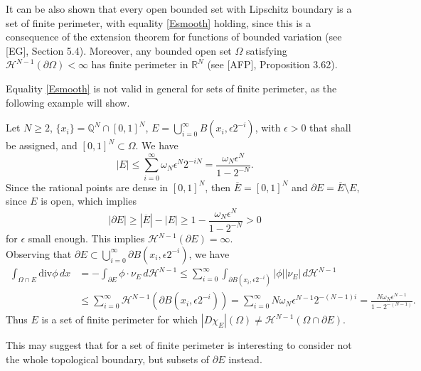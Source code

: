 \begin{remark} \label{finpersetexample} It can be also shown that every open bounded set with Lipschitz boundary is a set of finite perimeter, with equality \eqref{Esmooth} holding, since this is a consequence of the extension theorem for functions of bounded variation (see [EG], Section 5.4). Moreover, any bounded open set $\Omega$ satisfying $\mathcal{H}^{N - 1}(\partial \Omega) < \infty$ has finite perimeter in $\mathbb{R}^{N}$ (see [AFP], Proposition 3.62).
\end{remark}

Equality \eqref{Esmooth} is not valid in general for sets of finite perimeter, as the following example will show. 

\begin{example} Let $N \ge 2$, $\{ x_{i} \} = \mathbb{Q}^{N} \cap [0, 1]^{N}$, $E = \bigcup_{i = 0}^{\infty} B(x_{i}, \epsilon 2^{-i})$, with $\epsilon > 0$ that shall be assigned, and $[0, 1]^{N} \subset \Omega$. We have
\[ |E| \le \sum_{i = 0}^{\infty} \omega_{N} \epsilon^{N} 2^{-i N} = \frac{\omega_{N} \epsilon^{N}}{1 - 2^{- N}}. \]
Since the rational points are dense in $[0, 1]^{N}$, then $\overline{E} = [0, 1]^{N}$ and $\partial E = \overline{E} \setminus E$, since $E$ is open, which implies
\[ |\partial E| \ge |\overline{E}| - |E| \ge 1 - \frac{\omega_{N} \epsilon^{N}}{1 - 2^{- N}} > 0 \]
for $\epsilon$ small enough. This implies $\mathcal{H}^{N - 1}(\partial E) = \infty$. 
\\
Observing that $\partial E \subset \bigcup_{i = 0}^{\infty} \partial B(x_{i}, \epsilon 2^{- i})$, we have
\begin{align*} \int_{\Omega \cap E} \mathrm{div} \phi \, dx &  = - \int_{\partial E} \phi \cdot \nu_{E} \, d\mathcal{H}^{N - 1} \le \sum_{i = 0}^{\infty} \int_{\partial B(x_{i}, \epsilon 2^{- i})} |\phi| |\nu_{E}| \, d\mathcal{H}^{N - 1} \\
& \le  \sum_{i = 0}^{\infty} \mathcal{H}^{N - 1}(\partial B(x_{i}, \epsilon 2^{- i})) = \sum_{i = 0}^{\infty} N \omega_{N} \epsilon^{N - 1} 2^{- (N - 1) i} = \frac{N \omega_{N} \epsilon^{N - 1}}{1 - 2^{- (N - 1)}}.
\end{align*}
Thus $E$ is a set of finite perimeter for which $|D \chi_{E}|(\Omega) \neq \mathcal{H}^{N - 1}(\Omega \cap \partial E)$. 
\end{example}

This may suggest that for a set of finite perimeter is interesting to consider not the whole topological boundary, but subsets of $\partial E$ instead.






